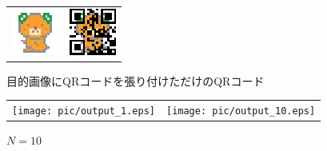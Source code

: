 \documentclass{thesis}
\begin{document}
\begin{figure}[H]
  \begin{tabular}{cc}
    \begin{minipage}[t]{0.45\hsize}
      \centering
      \includegraphics[width=0.5\linewidth]{pic/mican.eps}
      \caption{目的画像}
      \label{mican_pic}
    \end{minipage} &
    \begin{minipage}[t]{0.45\hsize}
    \centering
      \includegraphics[width=0.5\linewidth]{pic/nomal.eps}
      \caption{目的画像にQRコードを張り付けただけのQRコード}
      \label{fig:nomal}
      \end{minipage}
  \end{tabular}
\end{figure}

\begin{figure}[H]
  \begin{tabular}{cc}
    \begin{minipage}[t]{0.45\hsize}
      \centering
      \texttt{[image: pic/output\_1.eps]}
       \caption{$N=1$}
      \label{fig:output_1}
    \end{minipage} &
    \begin{minipage}[t]{0.45\hsize}
     \centering
      \texttt{[image: pic/output\_10.eps]}
       \caption{$N=10$}
      \label{fig:output_10}
      \end{minipage}
  \end{tabular}
\end{figure}
\end{document}
